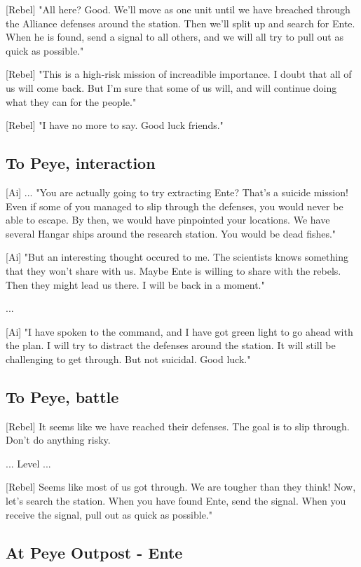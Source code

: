 \documentclass[a4paper,12pt]{article}
\begin{document}
[Rebel] "All here? Good. We'll move as one unit until we have breached through the Alliance defenses around the station.
Then we'll split up and search for Ente. When he is found, send a signal to all others, and we will all try to pull out as quick as
possible."

[Rebel] "This is a high-risk mission of increadible importance. I doubt that all of us will come back. But I'm sure that some of us
will, and will continue doing what they can for the people."

[Rebel] "I have no more to say. Good luck friends."

\subsection{To Peye, interaction}

[Ai] ... "You are actually going to try extracting Ente? That's a suicide mission! Even if some of you managed to slip through
the defenses, you would never be able to escape. By then, we would have pinpointed your locations. We have several
Hangar ships around the research station. You would be dead fishes."

[Ai] "But an interesting thought occured to me. The scientists knows something that they won't share with us.
Maybe Ente is willing to share with the rebels. Then they might lead us there. I will be back in a moment."

...

[Ai] "I have spoken to the command, and I have got green light to go ahead with the plan. I will try to distract the defenses
around the station. It will still be challenging to get through. But not suicidal. Good luck."

\subsection{To Peye, battle}

[Rebel] It seems like we have reached their defenses. The goal is to slip through. Don't do anything risky.

... Level ...

[Rebel] Seems like most of us got through. We are tougher than they think! Now, let's search the station.
When you have found Ente, send the signal. When you receive the signal, pull out as quick as possible."

\subsection{At Peye Outpost - Ente}
\end{document}
